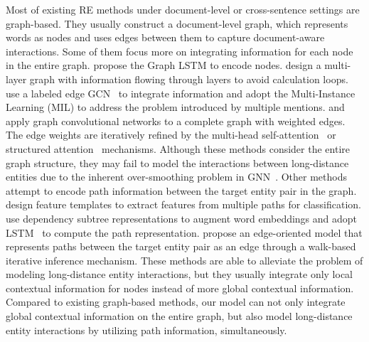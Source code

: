 \documentclass[letterpaper]{article} \usepackage{aaai21}  \usepackage{times}  \usepackage{helvet} \usepackage{courier}  \usepackage[hyphens]{url}  \usepackage{graphicx} \urlstyle{rm} \def\UrlFont{\rm}  \usepackage{natbib}  \usepackage{caption} \frenchspacing  \setlength{\pdfpagewidth}{8.5in}  \setlength{\pdfpageheight}{11in}
\begin{document}
Most of existing RE methods under document-level or cross-sentence settings are graph-based. 
They usually construct a document-level graph, which represents words as nodes and uses edges between them to capture document-aware interactions. 
Some of them focus more on integrating information for each node in the entire graph. 
\citet{graph_lstm} propose the Graph LSTM to encode nodes. 
\citet{gs_lstm} design a multi-layer graph with information flowing through layers to avoid calculation loops. 
\citet{gcnn} use a labeled edge GCN~\citep{labelled_edge_gcn} to integrate information and adopt the Multi-Instance Learning (MIL) to address the problem introduced by multiple mentions. 
\citet{aggcn} and \citet{lsr} apply graph convolutional networks to a complete graph with weighted edges. 
The edge weights are iteratively refined by the multi-head self-attention~\citep{transformer} or structured attention~\citep{structured_att,structured_text_rep} mechanisms. 
Although these methods consider the entire graph structure, they may fail to model the interactions between long-distance entities due to the inherent over-smoothing problem in GNN~\citep{over_smoothing}. 
Other methods attempt to encode path information between the target entity pair in the graph. 
\citet{quirk_and_poon} design feature templates to extract features from multiple paths for classification. 
\citet{idepnn} use dependency subtree representations to augment word embeddings and adopt LSTM~\citep{lstm} to compute the path representation. 
\citet{eog} propose an edge-oriented model that represents paths between the target entity pair as an edge through a walk-based iterative inference mechanism. 
These methods are able to alleviate the problem of modeling long-distance entity interactions, but they usually integrate only local contextual information for nodes instead of more global contextual information. 
Compared to existing graph-based methods, our model can not only integrate global contextual information on the entire graph, but also model long-distance entity interactions by utilizing path information, simultaneously. 
 
\end{document}
